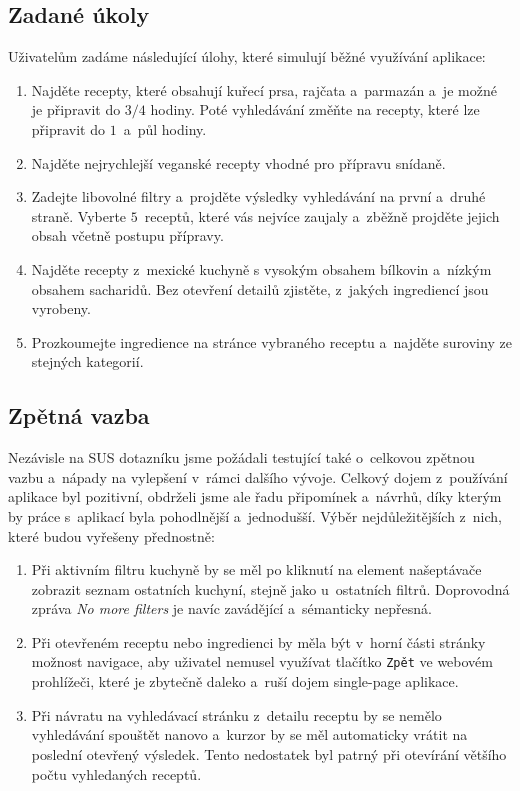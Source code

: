 \subsection{Zadané úkoly}

Uživatelům zadáme následující úlohy, které simulují běžné využívání aplikace:

\begin{enumerate}
    \item Najděte recepty, které obsahují kuřecí prsa, rajčata a~parmazán a~je možné je připravit do $3/4$ hodiny. Poté vyhledávání změňte na recepty, které lze připravit do $1$~a~půl hodiny.
    \item Najděte nejrychlejší veganské recepty vhodné pro přípravu snídaně.
    \item Zadejte libovolné filtry a~projděte výsledky vyhledávání na první a~druhé straně. Vyberte $5$~receptů, které vás nejvíce zaujaly a~zběžně projděte jejich obsah včetně postupu přípravy.
    \item Najděte recepty z~mexické kuchyně s vysokým obsahem bílkovin a~nízkým obsahem sacharidů. Bez otevření detailů zjistěte, z~jakých ingrediencí jsou vyrobeny.
    \item Prozkoumejte ingredience na stránce vybraného receptu a~najděte suroviny ze stejných kategorií.
\end{enumerate}

\subsection{Zpětná vazba}

Nezávisle na SUS dotazníku jsme požádali testující také o~celkovou zpětnou vazbu a~nápady na vylepšení v~rámci dalšího vývoje. Celkový dojem z~používání aplikace byl pozitivní, obdrželi jsme ale řadu připomínek a~návrhů, díky kterým by práce s~aplikací byla pohodlnější a~jednodušší. Výběr nejdůležitějších z~nich, které budou vyřešeny přednostně:

\begin{enumerate}
    \item Při aktivním filtru kuchyně by se měl po kliknutí na element našeptávače zobrazit seznam ostatních kuchyní, stejně jako u~ostatních filtrů. Doprovodná zpráva \emph{No more filters} je navíc zavádějící a~sémanticky nepřesná.
    \item Při otevřeném receptu nebo ingredienci by měla být v~horní části stránky možnost navigace, aby uživatel nemusel využívat tlačítko \texttt{Zpět} ve webovém prohlížeči, které je zbytečně daleko a~ruší dojem single-page aplikace.
    \item Při návratu na vyhledávací stránku z~detailu receptu by se nemělo vyhledávání spouštět nanovo a~kurzor by se měl automaticky vrátit na poslední otevřený výsledek. Tento nedostatek byl patrný při otevírání většího počtu vyhledaných receptů.
\end{enumerate}

